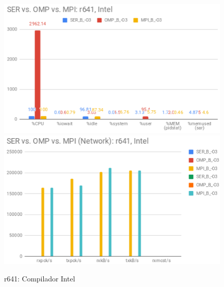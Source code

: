 \documentclass{article}
\begin{document}
\begin{appendices}
\begin{figure}[H]
    \centering
    \includegraphics[width=12cm]{Pictures/FT_SER_OMP_MPI_r641_Intel_Comp.png}
    \includegraphics[width=12cm]{Pictures/FT_SER_OMP_MPI_r641_Intel_Comm.png}
    \caption{r641: Compilador Intel}
    \label{fig:ft_ser_omp_mpi_r641_intel}
\end{figure}


\end{appendices}
\end{document}
